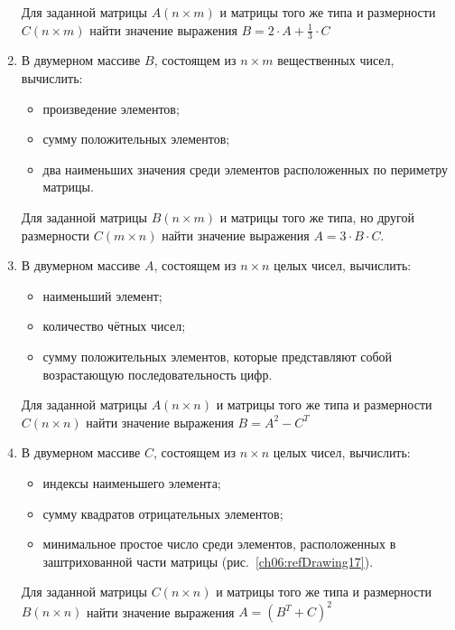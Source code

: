 \begin{enumerate}
Для заданной матрицы $A(n\times m)$ и матрицы того же типа и размерности
$C(n\times m)$ найти значение выражения  $B=2\cdot A+\frac{1}{3}\cdot C$  

\item В двумерном массиве $B$, состоящем из $n\times m$ вещественных чисел, вычислить:
\begin{itemize}
\item произведение элементов;
\item сумму положительных элементов;
\item два наименьших значения среди элементов расположенных по периметру матрицы.
\end{itemize}

Для заданной матрицы $B(n\times m)$ и матрицы того же типа, но другой размерности  
$C(m\times n)$ найти значение выражения  $A=3\cdot B\cdot C$.

\item В двумерном массиве $A$, состоящем из $n\times n$ целых чисел, вычислить: 
\begin{itemize}
\item наименьший элемент;
\item количество чётных чисел;
\item сумму положительных элементов, которые представляют собой возрастающую последовательность цифр.
\end{itemize}

Для заданной матрицы $A(n\times n)$ и матрицы того же типа и размерности
$C(n\times n)$ найти значение выражения  $B=A^2-C^T$  

\item В двумерном массиве $C$, состоящем из $n\times n$ целых чисел, вычислить:
\begin{itemize}
\item индексы наименьшего элемента;
\item сумму квадратов отрицательных элементов;
\item минимальное простое число среди элементов, расположенных в заштрихованной 
части матрицы (рис.~\ref{ch06:refDrawing17}).
\end{itemize}

Для заданной матрицы $C(n\times n)$ и матрицы того же типа и размерности
$B(n\times n)$ найти значение выражения  $A=(B^T+C)^2$  


\end{enumerate}
